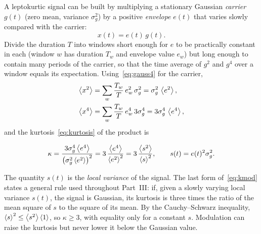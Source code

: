 A leptokurtic signal can be built by multiplying a stationary Gaussian \emph{carrier} $g(t)$ (zero
mean, variance $\sigma_g^2$) by a positive \emph{envelope} $e(t)$ that varies slowly compared with the
carrier:
\begin{equation}\label{eq:envcarrier}
  x(t) = e(t)\,g(t).
\end{equation}
Divide the duration $T$ into windows short enough for $e$ to be practically constant in each
(window $w$ has duration $T_w$ and envelope value $e_w$) but long enough to contain many periods of
the carrier, so that the time average of $g^2$ and $g^4$ over a window equals its expectation.
Using~\eqref{eq:gauss4} for the carrier,
\begin{align}
  \left\langle x^2 \right\rangle &= \sum_w \frac{T_w}{T}\, e_w^2\, \sigma_g^2 = \sigma_g^2\,\left\langle e^2 \right\rangle, \\
  \left\langle x^4 \right\rangle &= \sum_w \frac{T_w}{T}\, e_w^4\, 3\sigma_g^4 = 3\sigma_g^4\,\left\langle e^4 \right\rangle,
\end{align}
and the kurtosis~\eqref{eq:kurtosis} of the product is
\begin{result}
\begin{equation}\label{eq:kmod}
  \kappa = \frac{3\sigma_g^4\left\langle e^4 \right\rangle}{\bigl(\sigma_g^2\left\langle e^2 \right\rangle\bigr)^2} = 3\,\frac{\left\langle e^4 \right\rangle}{\left\langle e^2 \right\rangle^2}
  = 3\,\frac{\left\langle s^2 \right\rangle}{\left\langle s \right\rangle^2}, \qquad s(t) = e(t)^2\sigma_g^2 .
\end{equation}
\end{result}
The quantity $s(t)$ is the \emph{local variance} of the signal. The last form of~\eqref{eq:kmod}
states a general rule used throughout Part~III: if, given a slowly varying local variance $s(t)$,
the signal is Gaussian, its kurtosis is three times the ratio of the mean square of $s$ to the square
of its mean. By the Cauchy--Schwarz inequality, $\left\langle s \right\rangle^2 \le \left\langle s^2 \right\rangle\left\langle 1 \right\rangle$, so
$\kappa\ge3$, with equality only for a constant $s$. Modulation can raise the kurtosis but never lower
it below the Gaussian value.
